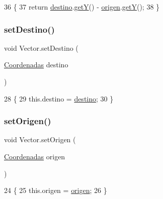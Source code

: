 \begin{DoxyCode}
36                        \{
37         \textcolor{keywordflow}{return} \mbox{\hyperlink{class_vector_af0a20e915c3efce53463578d8e73948e}{destino}}.\mbox{\hyperlink{class_coordenadas_aa10f46c8c62df3db3a05d4550f20b197}{getY}}() - \mbox{\hyperlink{class_vector_a3c83b7dd875429ec0bb3a799d928bc47}{origen}}.\mbox{\hyperlink{class_coordenadas_aa10f46c8c62df3db3a05d4550f20b197}{getY}}();
38     \}
\end{DoxyCode}
\mbox{\label{class_vector_acc3b5049ab01e2a6c7922c12347eb0cb}} 
\subsubsection{\texorpdfstring{set\+Destino()}{setDestino()}}
{\footnotesize\ttfamily void Vector.\+set\+Destino (\begin{DoxyParamCaption}\item[{\mbox{\hyperlink{class_coordenadas}{Coordenadas}}}]{destino }\end{DoxyParamCaption})\hspace{0.3cm}{\ttfamily [inline]}}


\begin{DoxyCode}
28                                                 \{
29         this.destino = \mbox{\hyperlink{class_vector_af0a20e915c3efce53463578d8e73948e}{destino}};
30     \}
\end{DoxyCode}
\mbox{\label{class_vector_a3ed415ef492b294d7ed8cf66f76a8b67}} 
\subsubsection{\texorpdfstring{set\+Origen()}{setOrigen()}}
{\footnotesize\ttfamily void Vector.\+set\+Origen (\begin{DoxyParamCaption}\item[{\mbox{\hyperlink{class_coordenadas}{Coordenadas}}}]{origen }\end{DoxyParamCaption})\hspace{0.3cm}{\ttfamily [inline]}}


\begin{DoxyCode}
24                                               \{
25         this.origen = \mbox{\hyperlink{class_vector_a3c83b7dd875429ec0bb3a799d928bc47}{origen}};
26     \}
\end{DoxyCode}


